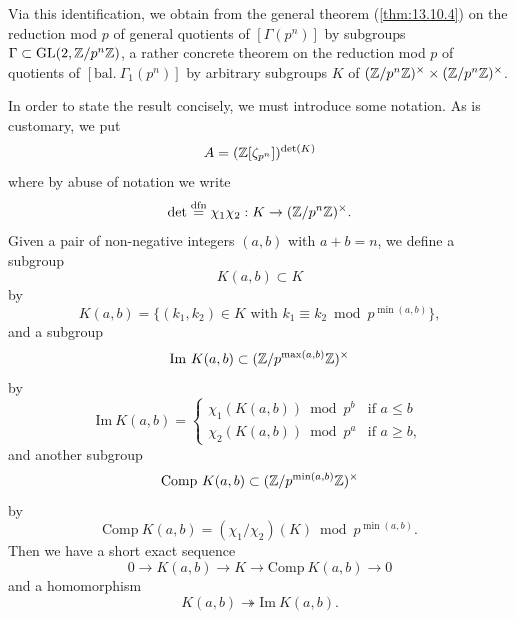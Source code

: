 \kmitem\label{item:13.12.2}
Via this identification, we obtain from the general theorem (\ref{thm:13.10.4}) on the reduction mod $p$ of general quotients of $[\Gamma(p^n)]$ by subgroups $\Gamma \subset \operatorname{GL}(2, \mathbb{Z}/p^n\mathbb{Z})$, a rather concrete theorem on the reduction mod $p$ of quotients of $[\mathrm{bal.\ }\Gamma_1(p^n)]$ by arbitrary subgroups $K$ of $(\mathbb{Z}/p^n\mathbb{Z})^\times \times (\mathbb{Z}/p^n\mathbb{Z})^\times$.
\par
In order to state the result concisely, we must introduce some notation. As is customary, we put
\begin{equation}\label{eq:13.12.2.1}
A = (\mathbb{Z}[\zeta_{p^n}])^{\det(K)}
\end{equation}
where by abuse of notation we write
\begin{equation}\label{eq:13.12.2.2}
\det \overset{\mathrm{dfn}}{=} \chi_1\chi_2 : K \to (\mathbb{Z}/p^n\mathbb{Z})^\times .
\end{equation}
Given a pair of non-negative integers $(a,b)$ with $a+b = n$, we define a subgroup
\[
K(a,b) \subset K
\]
by
\begin{equation}\label{eq:13.12.2.3}
K(a,b) = \{ (k_1, k_2) \in K \text{ with } k_1 \equiv k_2 \bmod p^{\min(a,b)} \} ,
\end{equation}
and a subgroup
\[
\mathrm{Im}\ K(a,b) \subset (\mathbb{Z}/p^{\max(a,b)}\mathbb{Z})^\times
\]
by
\begin{equation}\label{eq:13.12.2.4}
\mathrm{Im}\ K(a,b) = \begin{cases}
\chi_1(K(a,b)) \bmod p^b & \text{if } a \le b \\
\chi_2(K(a,b)) \bmod p^a & \text{if } a \ge b ,
\end{cases}
\end{equation}
and another subgroup
\[
\mathrm{Comp}\ K(a,b) \subset (\mathbb{Z}/p^{\min(a,b)}\mathbb{Z})^\times
\]
by
\begin{equation}\label{eq:13.12.2.5}
\mathrm{Comp}\ K(a,b) = (\chi_1/\chi_2)(K) \bmod p^{\min(a,b)} .
\end{equation}
Then we have a short exact sequence
\begin{equation}\label{eq:13.12.2.6}
0 \to K(a,b) \to K \to \mathrm{Comp}\ K(a,b) \to 0
\end{equation}
and a homomorphism
\begin{equation}\label{eq:13.12.2.7}
K(a,b) \twoheadrightarrow \mathrm{Im}\ K(a,b) .
\end{equation}

